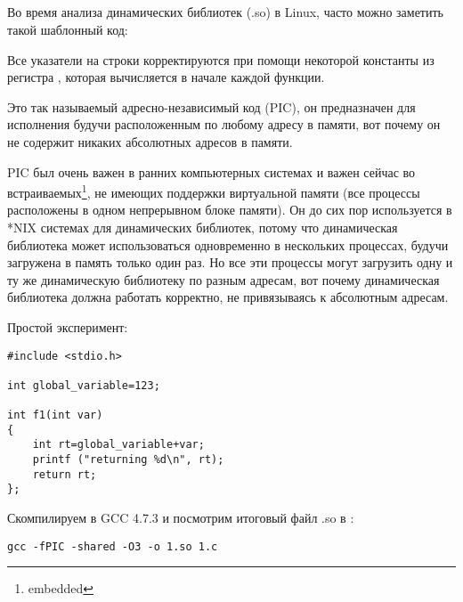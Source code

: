 \subsection{\CapitalPICcode}
\myindex{\PICcode}
\label{sec:PIC}

Во время анализа динамических библиотек (.so) в Linux, часто можно заметить такой шаблонный код:



Все указатели на строки корректируются при помощи некоторой константы из регистра \EBX, которая вычисляется в начале каждой функции.

Это так называемый адресно-независимый код (\ac{PIC}), он предназначен для исполнения будучи расположенным по любому адресу в памяти, вот почему он не содержит никаких абсолютных адресов в памяти.

\ac{PIC} был очень важен в ранних компьютерных системах и важен сейчас во встраиваемых\footnote{embedded}, не имеющих поддержки виртуальной памяти (все процессы расположены в одном непрерывном блоке памяти).
Он до сих пор используется в *NIX системах для динамических библиотек, потому что динамическая библиотека может использоваться одновременно в нескольких процессах, будучи загружена в память только один раз.
Но все эти процессы могут загрузить одну и ту же динамическую библиотеку по разным адресам, вот почему динамическая библиотека должна работать корректно, не привязываясь к абсолютным адресам.

Простой эксперимент:

\begin{lstlisting}[style=customc]
#include <stdio.h>

int global_variable=123;

int f1(int var)
{
    int rt=global_variable+var;
    printf ("returning %d\n", rt);
    return rt;
};
\end{lstlisting}

Скомпилируем в GCC 4.7.3 и посмотрим итоговый файл .so в \IDA:

\begin{lstlisting}
gcc -fPIC -shared -O3 -o 1.so 1.c
\end{lstlisting}



\newcommand{\retstring}{\IT{<<returning \%d\textbackslash{}n>>}}
\newcommand{\globvar}{\IT{global\_variable}}

